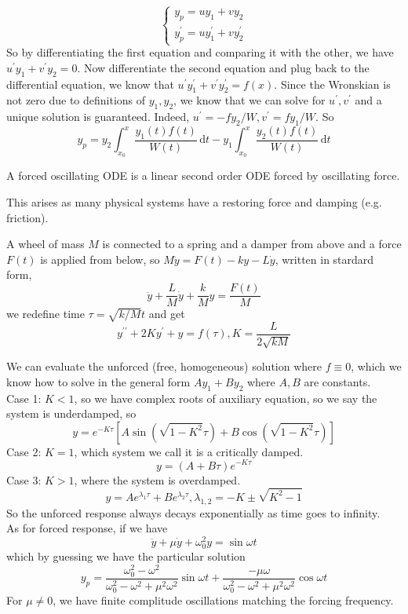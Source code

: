 $$
\begin{cases}
    y_p=uy_1+vy_2\\
    y_p^\prime=uy_1^\prime+vy_2^\prime
\end{cases}
$$
So by differentiating the first equation and comparing it with the other, we have $u^\prime y_1+v^\prime y_2=0$.
Now differentiate the second equation and plug back to the differential equation, we know that $u^\prime y_1^\prime+ v^\prime y_2^\prime =f(x)$.
Since the Wronskian is not zero due to definitions of $y_1,y_2$, we know that we can solve for $u^\prime,v^\prime$ and a unique solution is guaranteed.
Indeed, $u^\prime=-fy_2/W,v^\prime=fy_1/W$.
So
$$y_p=y_2\int_{x_0}^x\frac{y_1(t)f(t)}{W(t)}\,\mathrm dt-y_1\int_{x_0}^x\frac{y_2(t)f(t)}{W(t)}\,\mathrm dt$$
\begin{definition}
    A forced oscillating ODE is a linear second order ODE forced by oscillating force.
\end{definition}
This arises as many physical systems have a restoring force and damping (e.g. friction).
\begin{example}
    A wheel of mass $M$ is connected to a spring and a damper from above and a force $F(t)$ is applied from below, so $M\ddot{y}=F(t)-ky-L\dot{y}$, written in stardard form,
    $$\ddot{y}+\frac{L}{M}\dot{y}+\frac{k}{M}y=\frac{F(t)}{M}$$
    we redefine time $\tau=\sqrt{k/M}t$ and get
    $$y^{\prime\prime}+2Ky^\prime+y=f(\tau), K=\frac{L}{2\sqrt{kM}}$$
\end{example}
We can evaluate the unforced (free, homogeneous) solution where $f\equiv 0$, which we know how to solve in the general form $Ay_1+By_2$ where $A,B$ are constants.\\
Case 1: $K<1$, so we have complex roots of auxiliary equation, so we say the system is underdamped, so
$$y=e^{-K\tau}[A\sin(\sqrt{1-K^2}\tau)+B\cos(\sqrt{1-K^2}\tau)]$$
Case 2: $K=1$, which system we call it is a critically damped.
$$y=(A+B\tau)e^{-K\tau}$$
Case 3: $K>1$, where the system is overdamped.
$$y=Ae^{\lambda_1\tau}+Be^{\lambda_2\tau},\lambda_{1,2}=-K\pm\sqrt{K^2-1}$$
So the unforced response always decays exponentially as time goes to infinity.\\
As for forced response, if we have
$$\ddot{y}+\mu\dot{y}+\omega_0^2y=\sin{\omega t}$$
which by guessing we have the particular solution
$$y_p=\frac{\omega_0^2-\omega^2}{\omega_0^2-\omega^2+\mu^2\omega^2}\sin{\omega t}+\frac{-\mu\omega}{\omega_0^2-\omega^2+\mu^2\omega^2}\cos{\omega t}$$
For $\mu\neq 0$, we have finite complitude oscillations matching the forcing frequency.
